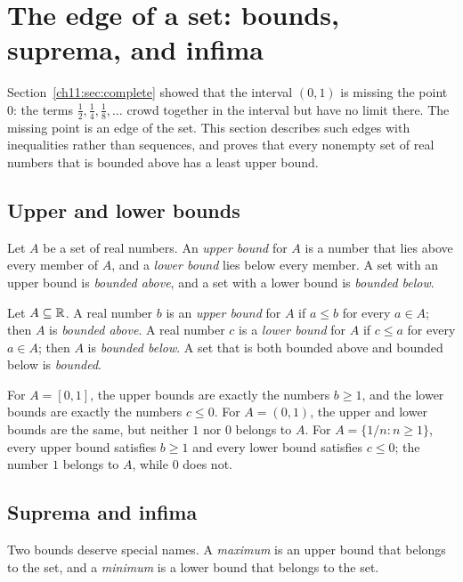 \section{The edge of a set: bounds, suprema, and infima}\label{ch11:sec:bounds}
Section~\ref{ch11:sec:complete} showed that the interval $(0,1)$ is missing the point $0$: the terms $\tfrac12,\tfrac14,\tfrac18,\ldots$ crowd together in the interval but have no limit there. The missing point is an edge of the set. This section describes such edges with inequalities rather than sequences, and proves that every nonempty set of real numbers that is bounded above has a least upper bound.

\subsection*{Upper and lower bounds}
Let $A$ be a set of real numbers. An \emph{upper bound} for $A$ is a number that lies above every member of $A$, and a \emph{lower bound} lies below every member. A set with an upper bound is \emph{bounded above}, and a set with a lower bound is \emph{bounded below}.

\par\noindent\begin{minipage}{\linewidth}
\begin{definition}\label{ch11:def:bounds}
Let $A\subseteq\mathbb R$. A real number $b$ is an \emph{upper bound} for $A$ if $a\le b$ for every $a\in A$; then $A$ is \emph{bounded above}. A real number $c$ is a \emph{lower bound} for $A$ if $c\le a$ for every $a\in A$; then $A$ is \emph{bounded below}. A set that is both bounded above and bounded below is \emph{bounded}.
\end{definition}
\end{minipage}\par

For $A=[0,1]$, the upper bounds are exactly the numbers $b\ge1$, and the lower bounds are exactly the numbers $c\le0$. For $A=(0,1)$, the upper and lower bounds are the same, but neither $1$ nor $0$ belongs to $A$. For $A=\{1/n:n\ge1\}$, every upper bound satisfies $b\ge1$ and every lower bound satisfies $c\le0$; the number $1$ belongs to $A$, while $0$ does not.

\subsection*{Suprema and infima}
Two bounds deserve special names. A \emph{maximum} is an upper bound that belongs to the set, and a \emph{minimum} is a lower bound that belongs to the set.

